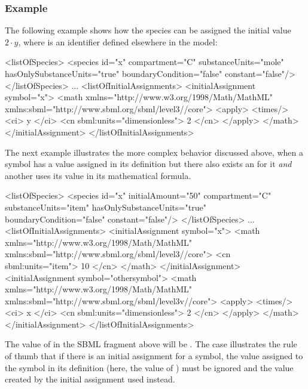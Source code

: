 \subsubsection{Example}

The following example shows how the species  can be
assigned the initial value $2 \cdot y$, where  is an
identifier defined elsewhere in the model:

\begin{example}
<listOfSpecies>
    <species id="x" compartment="C" substanceUnits="mole"
             hasOnlySubstanceUnits="true" boundaryCondition="false" 
             constant="false"/>
</listOfSpecies>
...
<listOfInitialAssignments>
    <initialAssignment symbol="x">
        <math xmlns="http://www.w3.org/1998/Math/MathML"
              xmlns:sbml="http://www.sbml.org/sbml/level3/\thisvlc/core">
            <apply>
                <times/> 
                <ci> y </ci> 
                <cn sbml:units="dimensionless"> 2 </cn>
            </apply>
        </math>
    </initialAssignment>
</listOfInitialAssignments>
\end{example}

The next example illustrates the more complex behavior discussed
above, when a symbol has a value assigned in its definition but
there also exists an \InitialAssignment for it \emph{and} another
\InitialAssignment uses its value in its mathematical formula.

\begin{example}
<listOfSpecies>
    <species id="x" initialAmount="50" compartment="C" substanceUnits="item"
             hasOnlySubstanceUnits="true" boundaryCondition="false" constant="false"/>
</listOfSpecies>
...
<listOfInitialAssignments>
    <initialAssignment symbol="x">
        <math xmlns="http://www.w3.org/1998/Math/MathML"
              xmlns:sbml="http://www.sbml.org/sbml/level3/\thisvlc/core">
            <cn sbml:units="item"> 10 </cn>
        </math>
    </initialAssignment>
    <initialAssignment symbol="othersymbol">
        <math xmlns="http://www.w3.org/1998/Math/MathML"
              xmlns:sbml="http://www.sbml.org/sbml/level3v/\thisvlc/core">
            <apply>
                <times/>
                <ci> x </ci>
                <cn sbml:units="dimensionless"> 2 </cn>
            </apply>
        </math>
    </initialAssignment>
</listOfInitialAssignments>
\end{example}

The value of  in the SBML fragment above will be
.  The case illustrates the rule of thumb that if there is
an initial assignment for a symbol, the value assigned to the
symbol in its definition (here, the value of
) must be ignored and the value created by
the initial assignment used instead.


